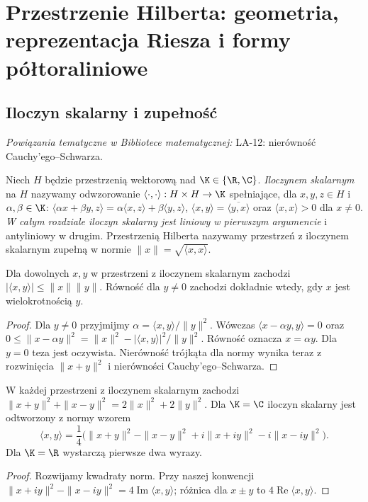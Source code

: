 \setcounter{section}{12}
\section{Przestrzenie Hilberta: geometria, reprezentacja Riesza i formy półtoraliniowe}
\label{sec:hilbert13}

\providecommand{\atlasref}[2]{#2}


\subsection{Iloczyn skalarny i zupełność}

\noindent\emph{Powiązania tematyczne w Bibliotece matematycznej:} \atlasref{LA-12::thm:lin12-cauchy-schwarz}{LA-12: nierówność Cauchy'ego--Schwarza}.


\begin{definicja}
\label{def:iloczyn-skalarny13}
Niech $H$ będzie przestrzenią wektorową nad $\K\in\{\R,\C\}$.
\emph{Iloczynem skalarnym} na $H$ nazywamy odwzorowanie
$\langle\cdot,\cdot\rangle:H\times H\to\K$ spełniające, dla
$x,y,z\in H$ i $\alpha,\beta\in\K$:
$\langle\alpha x+\beta y,z\rangle=\alpha\langle x,z\rangle+
\beta\langle y,z\rangle$,
$\langle x,y\rangle=\overline{\langle y,x\rangle}$ oraz
$\langle x,x\rangle>0$ dla $x\ne0$.
\emph{W całym rozdziale iloczyn skalarny jest liniowy w pierwszym
argumencie} i antyliniowy w drugim. Przestrzenią Hilberta nazywamy
przestrzeń z iloczynem skalarnym zupełną w normie
$\|x\|=\sqrt{\langle x,x\rangle}$.
\end{definicja}

\begin{lemat}
\label{lem:cs13}
Dla dowolnych $x,y$ w przestrzeni z iloczynem skalarnym zachodzi
$|\langle x,y\rangle|\le\|x\|\|y\|$.
Równość dla $y\ne0$ zachodzi dokładnie wtedy, gdy $x$ jest
wielokrotnością $y$.
\end{lemat}
\begin{proof}
Dla $y\ne0$ przyjmijmy $\alpha=\langle x,y\rangle/\|y\|^2$.
Wówczas $\langle x-\alpha y,y\rangle=0$ oraz
$0\le\|x-\alpha y\|^2=\|x\|^2-|\langle x,y\rangle|^2/\|y\|^2$.
Równość oznacza $x=\alpha y$. Dla $y=0$ teza jest oczywista.
Nierówność trójkąta dla normy wynika teraz z rozwinięcia
$\|x+y\|^2$ i nierówności Cauchy'ego--Schwarza.
\end{proof}

\begin{stwierdzenie}
\label{prop:parallelogram13}
W każdej przestrzeni z iloczynem skalarnym zachodzi
$\|x+y\|^2+\|x-y\|^2=2\|x\|^2+2\|y\|^2$.
Dla $\K=\C$ iloczyn skalarny jest odtworzony z normy wzorem
\[
\langle x,y\rangle=\frac14\bigl(\|x+y\|^2-\|x-y\|^2
+i\|x+iy\|^2-i\|x-iy\|^2\bigr).
\]
Dla $\K=\R$ wystarczą pierwsze dwa wyrazy.
\end{stwierdzenie}
\begin{proof}
Rozwijamy kwadraty norm. Przy naszej konwencji
$\|x+iy\|^2-\|x-iy\|^2=4\operatorname{Im}\langle x,y\rangle$;
różnica dla $x\pm y$ to $4\operatorname{Re}\langle x,y\rangle$.
\end{proof}

